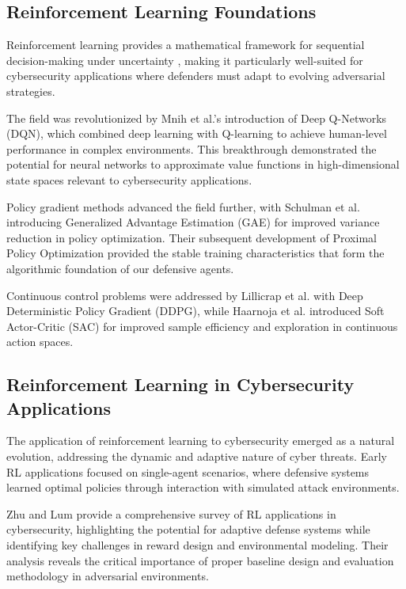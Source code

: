 \documentclass[12pt,twoside]{article}
\theoremstyle{definition}
\theoremstyle{plain}
\begin{document}
\subsection{Reinforcement Learning Foundations}

Reinforcement learning provides a mathematical framework for sequential decision-making under uncertainty \citep{sutton2018reinforcement}, making it particularly well-suited for cybersecurity applications where defenders must adapt to evolving adversarial strategies.

The field was revolutionized by Mnih et al.'s \cite{mnih2015human} introduction of Deep Q-Networks (DQN), which combined deep learning with Q-learning to achieve human-level performance in complex environments. This breakthrough demonstrated the potential for neural networks to approximate value functions in high-dimensional state spaces relevant to cybersecurity applications.

Policy gradient methods advanced the field further, with Schulman et al. \cite{schulman2015generalized} introducing Generalized Advantage Estimation (GAE) for improved variance reduction in policy optimization. Their subsequent development of Proximal Policy Optimization \cite{schulman2017proximal} provided the stable training characteristics that form the algorithmic foundation of our defensive agents.

Continuous control problems were addressed by Lillicrap et al. \cite{lillicrap2015continuous} with Deep Deterministic Policy Gradient (DDPG), while Haarnoja et al. \cite{haarnoja2018soft} introduced Soft Actor-Critic (SAC) for improved sample efficiency and exploration in continuous action spaces.

\subsection{Reinforcement Learning in Cybersecurity Applications}

The application of reinforcement learning to cybersecurity emerged as a natural evolution, addressing the dynamic and adaptive nature of cyber threats. Early RL applications focused on single-agent scenarios, where defensive systems learned optimal policies through interaction with simulated attack environments.

Zhu and Lum \cite{zhu2021survey} provide a comprehensive survey of RL applications in cybersecurity, highlighting the potential for adaptive defense systems while identifying key challenges in reward design and environmental modeling. Their analysis reveals the critical importance of proper baseline design and evaluation methodology in adversarial environments.
\end{document}

